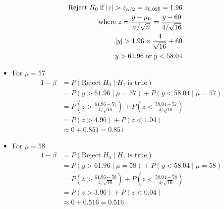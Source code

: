 \documentclass{uofa-eng-assignment}
\begin{document}
\begin{enumerate}
\begin{align*}
            \text{Reject}\;H_0\;\text{if}\;|z| > z_{\alpha/2} = z_{0.025} = 1.96                             \\
            \text{where}\;z = \frac{\bar{y} - \mu_0}{\sigma / \sqrt{n}} = \frac{\bar{y} - 60}{4 / \sqrt{16}} \\
            \absolutevalue{\bar{y} } > 1.96 \times \frac{4}{\sqrt{16}} + 60                                  \\
            \bar{y} > 61.96\;\text{or}\;\bar{y} < 58.04
        \end{align*}
        \begin{itemize}
            \item For $\mu = 57$
                  \begin{align*}
                      1 - \beta & = P(\text{Reject}\;H_0\;|\;H_1\;\text{is true})                                                 \\
                                & = P(\bar{y} > 61.96\;|\;\mu = 57) + P(\bar{y} < 58.04\;|\;\mu = 57)                             \\
                                & = P(z > \frac{61.96 - 57}{4 / \sqrt{16}}) + P(z <\frac{58.04 - 57}{4 / \sqrt{16}})              \\
                                & = P(z > 4.96) +  P(z < 1.04)                                                                    \\
                                & \approx 0 + 0.851                                                                       = 0.851
                  \end{align*}
            \item For $\mu = 58$
                  \begin{align*}
                      1 - \beta & = P(\text{Reject}\;H_0\;|\;H_1\;\text{is true})                                                 \\
                                & = P(\bar{y} > 61.96\;|\;\mu = 58) + P(\bar{y} < 58.04\;|\;\mu = 58)                             \\
                                & = P(z > \frac{61.96 - 58}{4 / \sqrt{16}}) + P(z <\frac{58.04 - 58}{4 / \sqrt{16}})              \\
                                & = P(z > 3.96) +  P(z < 0.04)                                                                    \\
                                & \approx 0 + 0.516                                                                       = 0.516

\end{align*}
\end{itemize}
\end{enumerate}
\end{document}
